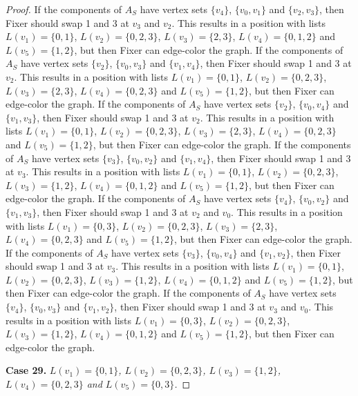 \documentclass[12pt]{amsart}
\theoremstyle{plain}
\theoremstyle{definition}
\theoremstyle{remark}
\begin{document}
\begin{proof}
If the components of $A_S$ have vertex sets $\{v_4\}$, $\{v_0, v_1\}$ and $\{v_2, v_3\}$, then Fixer should swap 1 and 3 at $v_3$ and $v_2$. This results in a position with lists $L(v_1) = \{0, 1\}$, $L(v_2) = \{0, 2, 3\}$, $L(v_3) = \{2, 3\}$, $L(v_4) = \{0, 1, 2\}$ and $L(v_5) = \{1, 2\}$, but then Fixer can edge-color the graph.
If the components of $A_S$ have vertex sets $\{v_2\}$, $\{v_0, v_3\}$ and $\{v_1, v_4\}$, then Fixer should swap 1 and 3 at $v_2$. This results in a position with lists $L(v_1) = \{0, 1\}$, $L(v_2) = \{0, 2, 3\}$, $L(v_3) = \{2, 3\}$, $L(v_4) = \{0, 2, 3\}$ and $L(v_5) = \{1, 2\}$, but then Fixer can edge-color the graph.
If the components of $A_S$ have vertex sets $\{v_2\}$, $\{v_0, v_4\}$ and $\{v_1, v_3\}$, then Fixer should swap 1 and 3 at $v_2$. This results in a position with lists $L(v_1) = \{0, 1\}$, $L(v_2) = \{0, 2, 3\}$, $L(v_3) = \{2, 3\}$, $L(v_4) = \{0, 2, 3\}$ and $L(v_5) = \{1, 2\}$, but then Fixer can edge-color the graph.
If the components of $A_S$ have vertex sets $\{v_3\}$, $\{v_0, v_2\}$ and $\{v_1, v_4\}$, then Fixer should swap 1 and 3 at $v_3$. This results in a position with lists $L(v_1) = \{0, 1\}$, $L(v_2) = \{0, 2, 3\}$, $L(v_3) = \{1, 2\}$, $L(v_4) = \{0, 1, 2\}$ and $L(v_5) = \{1, 2\}$, but then Fixer can edge-color the graph.
If the components of $A_S$ have vertex sets $\{v_4\}$, $\{v_0, v_2\}$ and $\{v_1, v_3\}$, then Fixer should swap 1 and 3 at $v_2$ and $v_0$. This results in a position with lists $L(v_1) = \{0, 3\}$, $L(v_2) = \{0, 2, 3\}$, $L(v_3) = \{2, 3\}$, $L(v_4) = \{0, 2, 3\}$ and $L(v_5) = \{1, 2\}$, but then Fixer can edge-color the graph.
If the components of $A_S$ have vertex sets $\{v_3\}$, $\{v_0, v_4\}$ and $\{v_1, v_2\}$, then Fixer should swap 1 and 3 at $v_3$. This results in a position with lists $L(v_1) = \{0, 1\}$, $L(v_2) = \{0, 2, 3\}$, $L(v_3) = \{1, 2\}$, $L(v_4) = \{0, 1, 2\}$ and $L(v_5) = \{1, 2\}$, but then Fixer can edge-color the graph.
If the components of $A_S$ have vertex sets $\{v_4\}$, $\{v_0, v_3\}$ and $\{v_1, v_2\}$, then Fixer should swap 1 and 3 at $v_3$ and $v_0$. This results in a position with lists $L(v_1) = \{0, 3\}$, $L(v_2) = \{0, 2, 3\}$, $L(v_3) = \{1, 2\}$, $L(v_4) = \{0, 1, 2\}$ and $L(v_5) = \{1, 2\}$, but then Fixer can edge-color the graph.

\noindent\textbf{Case 29.  }\textit{$L(v_1) = \{0, 1\}$, $L(v_2) = \{0, 2, 3\}$, $L(v_3) = \{1, 2\}$, $L(v_4) = \{0, 2, 3\}$ and $L(v_5) = \{0, 3\}$.}


\end{proof}
\end{document}

